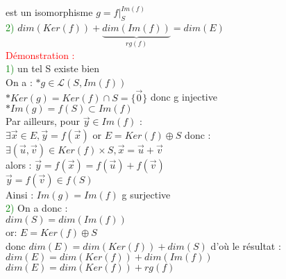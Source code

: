 \documentclass{article}
\begin{document}
est un isomorphisme $g= f|_{S}^{Im(f)}$ \\
\textcolor{green}{2)} $dim(Ker(f))+\underbrace{dim(Im(f))}_{rg(f)} =dim(E)$ \\
\textcolor{red}{Démonstration :} \\
\textcolor{green}{1)} un tel S existe bien \\
On a : $\ast g \in \mathcal L (S,Im(f))$ \\
$\ast Ker(g)=Ker(f) \cap S =\lbrace \vec 0 \rbrace$ donc g injective \\
$\ast Im(g)=f(S) \subset Im(f)$ \\
Par ailleurs, pour $\vec y \in Im(f)$ : \\
$\exists \vec x \in E, \vec y=f(\vec x)$ or $E=Ker(f) \oplus S$ donc : \\
$\exists (\vec u, \vec v) \in Ker(f) \times S, \vec x =\vec u + \vec v$ \\
alors : $\vec y= f(\vec x)= f(\vec u)+ f(\vec v)$ \\
$\vec y = f(\vec v) \in f(S)$ \\
Ainsi : $Im(g)=Im(f)$ g surjective \\
\textcolor{green}{2)} On a donc : \\
$dim(S)=dim(Im(f))$ \\
or: $E=Ker(f) \oplus S$ \\
donc $dim(E)=dim(Ker(f))+dim(S)$ d'où le résultat : \\
$dim(E)=dim(Ker(f))+dim(Im(f))$ \\
$dim(E)=dim(Ker(f))+rg(f)$
\end{document}
